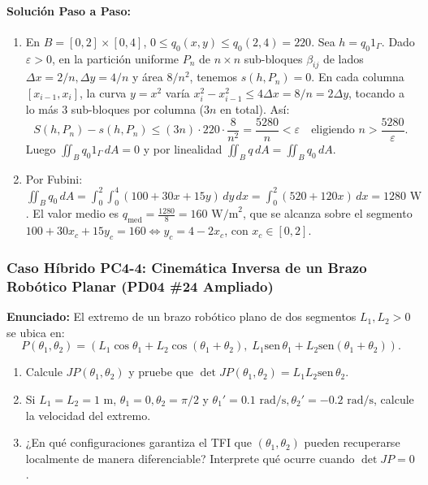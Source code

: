 \documentclass[11pt,a4paper]{article}
\begin{document}
\paragraph{Solución Paso a Paso:}
\begin{enumerate}[label=\textbf{\alph*)}]
  \item En $B=[0,2]\times[0,4]$, $0 \le q_0(x,y) \le q_0(2,4) = 220$. Sea $h = q_0 1_\Gamma$. Dado $\varepsilon > 0$, en la partición uniforme $P_n$ de $n\times n$ sub-bloques $\beta_{ij}$ de lados $\Delta x = 2/n, \Delta y = 4/n$ y área $8/n^2$, tenemos $s(h,P_n)=0$. En cada columna $[x_{i-1},x_i]$, la curva $y=x^2$ varía $x_i^2-x_{i-1}^2 \le 4\Delta x = 8/n = 2\Delta y$, tocando a lo más $3$ sub-bloques por columna ($3n$ en total). Así:
  \[ S(h, P_n) - s(h, P_n) \le (3n)\cdot 220 \cdot \frac{8}{n^2} = \frac{5280}{n} < \varepsilon \quad \text{eligiendo } n > \frac{5280}{\varepsilon}. \]
  Luego $\iint_B q_0 1_\Gamma\,dA = 0$ y por linealidad $\iint_B q\,dA = \iint_B q_0\,dA$.
  \item Por Fubini: $\iint_B q_0\,dA = \int_0^2 \int_0^4 (100+30x+15y)\,dy\,dx = \int_0^2 (520+120x)\,dx = 1280\text{ W}$. El valor medio es $q_{\text{med}} = \frac{1280}{8} = 160\text{ W/m}^2$, que se alcanza sobre el segmento $100+30x_c+15y_c = 160 \iff y_c = 4 - 2x_c$, con $x_c \in [0,2]$.
\end{enumerate}

\subsubsection*{Caso Híbrido PC4-4: Cinemática Inversa de un Brazo Robótico Planar (PD04 \#24 Ampliado)}
\begin{tcolorbox}[colback=white,colframe=gray!40,arc=1mm,boxrule=0.5pt]
\textbf{Enunciado:} El extremo de un brazo robótico plano de dos segmentos $L_1, L_2 > 0$ se ubica en:
\[ P(\theta_1, \theta_2) = \left( L_1\cos\theta_1 + L_2\cos(\theta_1+\theta_2), \; L_1\text{sen}\,\theta_1 + L_2\text{sen}(\theta_1+\theta_2) \right). \]
\begin{enumerate}[label=\textbf{\alph*)}]
  \item Calcule $JP(\theta_1, \theta_2)$ y pruebe que $\det JP(\theta_1, \theta_2) = L_1 L_2 \text{sen}\,\theta_2$.
  \item Si $L_1 = L_2 = 1\text{ m}$, $\theta_1 = 0, \theta_2 = \pi/2$ y $\theta_1' = 0.1\text{ rad/s}, \theta_2' = -0.2\text{ rad/s}$, calcule la velocidad del extremo.
  \item ¿En qué configuraciones garantiza el TFI que $(\theta_1,\theta_2)$ pueden recuperarse localmente de manera diferenciable? Interprete qué ocurre cuando $\det JP = 0$.
\end{enumerate}
\end{tcolorbox}
\end{document}
